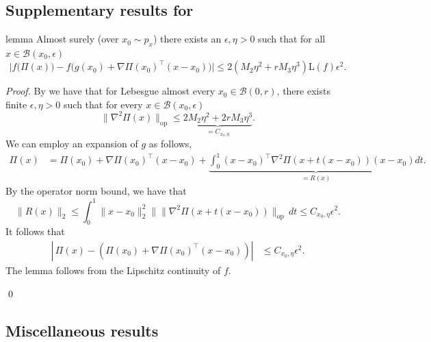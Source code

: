 \documentclass[11pt]{article}
\begin{document}
\subsection{Supplementary results for }

\begin{restatable}[Approximation]{lemma}{} \label{lemma: proj approx}
    Almost surely (over $x_0 \sim p_x$) there exists an $\epsilon, \eta > 0$ such that for all $x \in \mathcal{B}(x_0, \epsilon)$ 
    \[\bigg|f\big(\Pi(x)\big) - f\big(g(x_0) + \nabla \Pi(x_0)^{\top}(x-x_0) \big)\bigg| \le 2(M_2\eta^2+rM_3\eta^3)\text{L}(f)\epsilon^2. \]
\end{restatable}

\noindent \textit{Proof.} By  we have that for Lebesgue almost every $x_0 \in \mathcal{B}(0,r)$, there exists finite $\epsilon, \eta > 0$ such that for every $x \in \mathcal{B}(x_0, \epsilon)$
\[\|\nabla^2\Pi(x)\|_{\text{op}} \leq \underbrace{2M_2\eta^{2}+2rM_3\eta^3}_{= C_{x_0, \eta}}.\]
We can employ an expansion of $g$ as follows,
\begin{align*}
    \Pi(x) &= \Pi(x_0) + \nabla \Pi(x_0)^{\top}(x-x_0) + \underbrace{\int_{0}^{1}(x-x_0)^{\top}\nabla^2\Pi(x+t(x-x_0))(x-x_0) dt}_{= R(x)}.
\end{align*}
By the operator norm bound, we have that
\[\|R(x)\|_2 \leq \int_{0}^{1}\|x - x_0\|_2^2\|\|\nabla^2\Pi(x+t(x-x_0))\|_{\text{op}} \,dt \leq C_{x_0, \eta}\epsilon^2.\]
It follows that 
\begin{align}
    \left|\,\Pi(x) - \left(\Pi(x_0) + \nabla\Pi(x_0)^{\top}(x-x_0)\right)\right| &\leq C_{x_0, \eta}\epsilon^2. \label{projection second order bound}
\end{align}
The lemma follows from the Lipschitz continuity of $f$. 

\qed{}

\subsection{Miscellaneous results}
\end{document}
